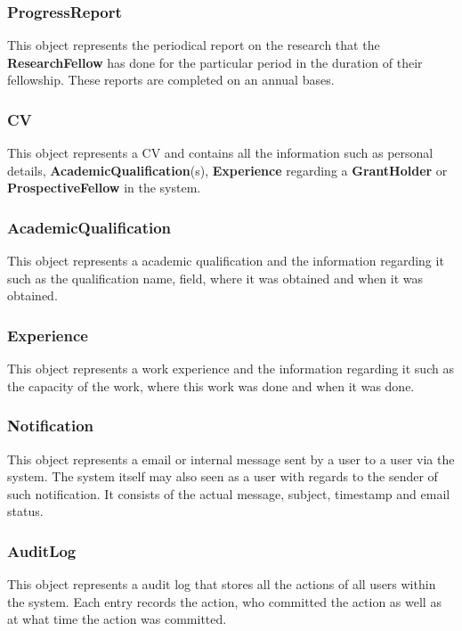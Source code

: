 \documentclass[12pt]{article}
\begin{document}
\subsubsection{ProgressReport}
This object represents the periodical report on the research that the \textbf{ResearchFellow} has done for the particular period in the duration of their fellowship. These reports are completed on an annual bases.

\subsubsection{CV}
This object represents a CV and contains all the information such as personal details, \textbf{AcademicQualification}(s), \textbf{Experience} regarding a \textbf{GrantHolder} or \textbf{ProspectiveFellow} in the system.

\subsubsection{AcademicQualification}
This object represents a academic qualification and the information regarding it such as the qualification name, field, where it was obtained and when it was obtained.

\subsubsection{Experience}
This object represents a work experience and the information regarding it such as the capacity of the work, where this work was done and when it was done.

\subsubsection{Notification}
This object represents a email or internal message sent by a user to a user via the system. The system itself may also seen as a user with regards to the sender of such notification. It consists of the actual message, subject, timestamp and email status. 

\subsubsection{AuditLog}
This object represents a audit log that stores all the actions of all users within the system. Each entry records the action, who committed the action as well as at what time the action was committed.

\newpage
\end{document}
